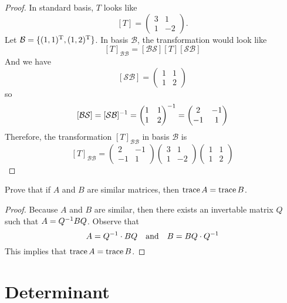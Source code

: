 \documentclass{article}
\begin{document}
\begin{proof}
  In standard basis, $T$ looks like
  \[ [T]= \begin{pmatrix} 3 &1\\ 1 &-2 \end{pmatrix}.\]
  Let $\mathcal{B}=\{(1,1)^\mathrm{T}, (1,2)^\mathrm{T}\}$. In basis $\mathcal{B}$,
  the transformation would look like
  \[
    [T]_{\mathcal{BB}}= [\mathcal{BS}] [T] [\mathcal{SB}]
  \]
  And we have
  \[ [\mathcal{SB}]= \begin{pmatrix} 1 &1\\ 1 &2 \end{pmatrix} \]
  so
  \[
    [\mathcal{BS}]= [\mathcal{SB}]^{-1}=
    \begin{pmatrix} 1 &1\\ 1 &2 \end{pmatrix}^{-1}=
    \begin{pmatrix} 2 &-1\\ -1&1 \end{pmatrix}
  \]
  Therefore, the transformation $[T]_{\mathcal{BB}}$ in basis
  $\mathcal{B}$ is
  \[
    [T]_{\mathcal{BB}}=
    \begin{pmatrix} 2 &-1\\ -1&1 \end{pmatrix}
    \begin{pmatrix} 3 &1\\ 1 &-2 \end{pmatrix}
    \begin{pmatrix} 1 &1\\ 1 &2 \end{pmatrix} 
  \]
\end{proof}
\begin{exercise}
  Prove that if $A$ and $B$ are similar matrices, then
  $\operatorname{trace} A=\operatorname{trace} B$.
\end{exercise}
\begin{proof}
  Because $A$ and $B$ are similar, then there exists 
  an invertable matrix $Q$ such that $A=Q^{-1} BQ$. Observe that
  \[
    A=Q^{-1}\cdot BQ
    \quad\text{and}\quad
    B=BQ\cdot Q^{-1}
  \]
  This implies that $\operatorname{trace} A=\operatorname{trace} B$.
\end{proof}

\chapter{Determinant}
\setcounter{section}{2}
\end{document}
